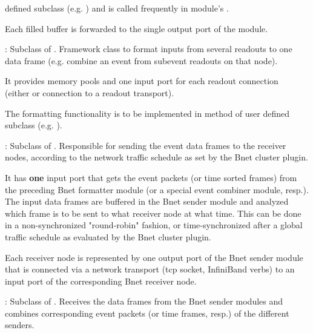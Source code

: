 \begin{description}
\begin{compactenum}
      defined subclass (e.g. ) and is called frequently 
      in module's . 
  \item Each filled buffer is forwarded to the single output port of the module. 
\end{compactenum}
\item[\class{bnet::FormaterModule}] : Subclass of . 
   Framework class to format inputs from several readouts to one data 
   frame (e.g. combine an event from subevent readouts on that node). 
\begin{compactenum}
  \item It provides memory pools and one input port for each 
      readout connection \\
      (either  or connection to a 
      readout transport). 
  \item The formatting functionality is to be implemented in method 
       of user defined subclass (e.g. ).
\end{compactenum}
\item[\class{bnet::SenderModule}] : Subclass of . 
   Responsible for sending the event data frames to the receiver 
   nodes, according to the network traffic schedule as set by the Bnet cluster plugin.
\begin{compactenum}
  \item It has {\bf one} input port that gets the event packets 
      (or time sorted frames) from the preceding 
      Bnet formatter module (or a special event combiner module, resp.). 
      The input data frames are buffered in the Bnet sender module and analyzed 
      which frame is to be sent to what receiver node at what time. 
      This can be done in a non-synchronized "round-robin" fashion, 
      or time-synchronized after a global traffic schedule as evaluated by 
      the Bnet cluster plugin.  
  \item Each receiver node is represented by one output port of 
      the Bnet sender module that is connected via a network transport 
      (tcp socket, InfiniBand verbs) to an input port of the 
      corresponding Bnet receiver node.
\end{compactenum}
\item[\class{bnet::ReceiverModule}] : Subclass of . 
   Receives the data frames from the Bnet sender modules and 
   combines corresponding event packets (or time frames, resp.) of the different senders.

\end{description}
